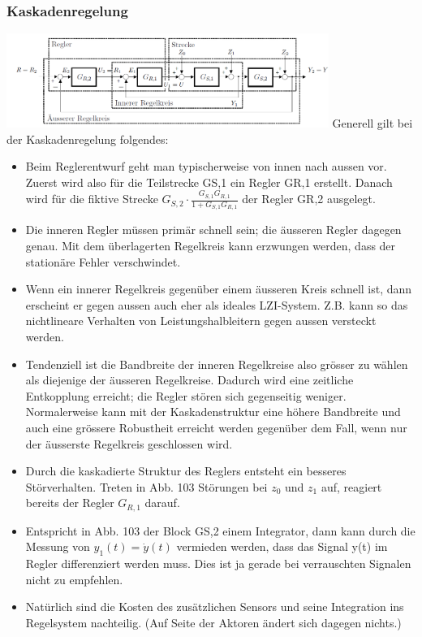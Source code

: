\subsubsection{Kaskadenregelung}
\begin{multicols}{2}
\includegraphics[width=10.5cm]{./images/KaskadenRegelung.png}
Generell gilt bei der Kaskadenregelung folgendes:
\begin{itemize}
\item Beim Reglerentwurf geht man typischerweise von innen nach aussen vor. Zuerst
wird also für die Teilstrecke GS,1 ein Regler GR,1 erstellt. Danach wird für die
fiktive Strecke $G_{S,2} \cdot \frac{G_{S,1}G_{R,1}}{1+G_{S,1}G_{R,1}}$
der Regler GR,2 ausgelegt.
\item Die inneren Regler müssen primär schnell sein; die äusseren Regler dagegen
genau. Mit dem überlagerten Regelkreis kann erzwungen werden, dass der stationäre Fehler verschwindet.
\item Wenn ein innerer Regelkreis gegenüber einem äusseren Kreis schnell ist, dann
erscheint er gegen aussen auch eher als ideales LZI-System. Z.B. kann so das
nichtlineare Verhalten von Leistungshalbleitern gegen aussen versteckt werden.
\item Tendenziell ist die Bandbreite der inneren Regelkreise also grösser zu wählen
als diejenige der äusseren Regelkreise. Dadurch wird eine zeitliche Entkopplung
erreicht; die Regler stören sich gegenseitig weniger.
Normalerweise kann mit der Kaskadenstruktur eine höhere Bandbreite und
auch eine grössere Robustheit erreicht werden gegenüber dem Fall, wenn nur
der äusserste Regelkreis geschlossen wird.
\item Durch die kaskadierte Struktur des Reglers entsteht ein besseres Störverhalten.
Treten in Abb. 103 Störungen bei $z_0$ und $z_1$ auf, reagiert bereits der Regler
$G_{R,1}$ darauf.
\item Entspricht in Abb. 103 der Block GS,2 einem Integrator, dann kann durch die
Messung von $y_1(t) = \dot{y}(t)$ vermieden werden, dass das Signal y(t) im Regler
differenziert werden muss. Dies ist ja gerade bei verrauschten Signalen nicht
zu empfehlen.
\item Natürlich sind die Kosten des zusätzlichen Sensors und seine Integration ins
Regelsystem nachteilig. (Auf Seite der Aktoren ändert sich dagegen nichts.)
\end{itemize}
\end{multicols}

